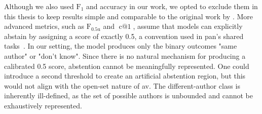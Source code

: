 
Although we also used $\operatorname{F_{1}}$ and accuracy in our work, we opted to exclude them in this thesis to keep results simple and comparable to the original work by \citet{koppel_determining_2014}.
More advanced metrics, such as $\operatorname{F_{0.5u}}$ and $\operatorname{c@1}$, assume that models can explicitly abstain by assigning a score of exactly 0.5, a convention used in \acs{pan}'s shared tasks~\citep{tyo_state_2022,bevendorff_overview_2024,kocher_unine_2015}. 
In our setting, the model produces only the binary outcomes "same author" or "don't know". 
Since there is no natural mechanism for producing a calibrated 0.5 score, abstention cannot be meaningfully represented. 
One could introduce a second threshold to create an artificial abstention region, but this would not align with the open-set nature of \ac{av}. 
The different-author class is inherently ill-defined, as the set of possible authors is unbounded and cannot be exhaustively represented. 

